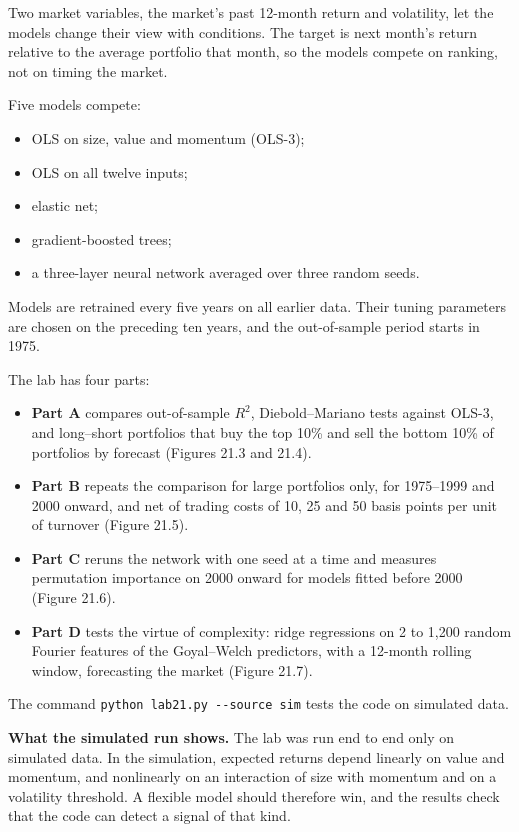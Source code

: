 Two market variables, the market's past 12-month return and volatility, let the models change their view with conditions. The target is next month's return relative to the average portfolio that month, so the models compete on ranking, not on timing the market.

Five models compete:

\begin{itemize}
  \item OLS on size, value and momentum (OLS-3);
  \item OLS on all twelve inputs;
  \item elastic net;
  \item gradient-boosted trees;
  \item a three-layer neural network averaged over three random seeds.
\end{itemize}

Models are retrained every five years on all earlier data. Their tuning parameters are chosen on the preceding ten years, and the out-of-sample period starts in 1975.

The lab has four parts:

\begin{itemize}
  \item \textbf{Part A} compares out-of-sample $R^2$, Diebold--Mariano tests against OLS-3, and long--short portfolios that buy the top 10\% and sell the bottom 10\% of portfolios by forecast (Figures 21.3 and 21.4).
  \item \textbf{Part B} repeats the comparison for large portfolios only, for 1975--1999 and 2000 onward, and net of trading costs of 10, 25 and 50 basis points per unit of turnover (Figure 21.5).
  \item \textbf{Part C} reruns the network with one seed at a time and measures permutation importance on 2000 onward for models fitted before 2000 (Figure 21.6).
  \item \textbf{Part D} tests the virtue of complexity: ridge regressions on 2 to 1,200 random Fourier features of the Goyal--Welch predictors, with a 12-month rolling window, forecasting the market (Figure 21.7).
\end{itemize}

The command \texttt{python lab21.py -{}-source sim} tests the code on simulated data.

\textbf{What the simulated run shows.} The lab was run end to end only on simulated data. In the simulation, expected returns depend linearly on value and momentum, and nonlinearly on an interaction of size with momentum and on a volatility threshold. A flexible model should therefore win, and the results check that the code can detect a signal of that kind.

